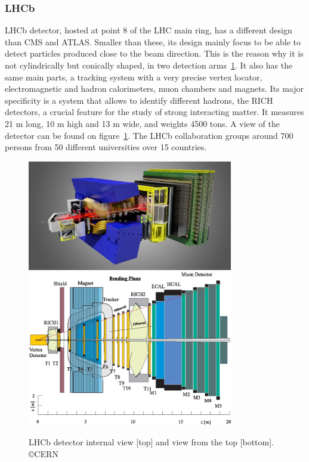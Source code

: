 \subsubsection{LHCb}
\label{sec:lhcb}

LHCb detector, hosted at point 8 of the LHC main ring, has a different design than CMS and ATLAS. Smaller than these, its design mainly focus to be able to detect particles produced close to the beam direction. This is the reason why it is not cylindrically but conically shaped, in two detection arms~\ref{fig:lhcbdet}. It also has the same main parts, a tracking system with a very precise vertex locator, electromagnetic and hadron calorimeters, muon chambers and magnets. Its major specificity is a system that allows to identify different hadrons, the RICH detectors, a crucial feature for the study of strong interacting matter. It measures 21 m long, 10 m high and 13 m wide, and weights 4500 tons. A view of the detector can be found on figure~\ref{fig:lhcbdet}. The LHCb collaboration groups around 700 persons from 50 different universities over 15 countries. 

\begin{figure}[!Hhtbp]
  \begin{center}
    \includegraphics[width=0.8\textwidth]{figs/LHCbDetectorlight1.jpg}
    \includegraphics[width=0.8\textwidth]{figs/LHCb_UpView.jpg}
    \caption{LHCb detector internal view [top] and view from the top [bottom]. \copyright CERN}
    \label{fig:lhcbdet}
  \end{center}
\end{figure}


